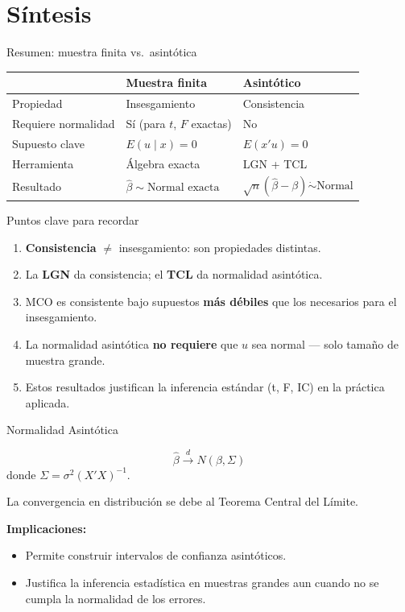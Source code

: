 \documentclass{beamer}
\begin{document}
\section{Síntesis}

\begin{frame}{Resumen: muestra finita vs.\ asintótica}
\begin{table}
\centering
\small
\begin{tabular}{lll}
\toprule
& \textbf{Muestra finita} & \textbf{Asintótico} \\
\midrule
Propiedad & Insesgamiento & Consistencia \\
Requiere normalidad & Sí (para $t$, $F$ exactas) & No \\
Supuesto clave & $E(u\mid x) = 0$ & $E(x'u) = 0$ \\
Herramienta & Álgebra exacta & LGN + TCL \\
Resultado & $\hat\beta \sim \text{Normal exacta}$ & $\sqrt{n}(\hat\beta-\beta) \dot\sim \text{Normal}$ \\
\bottomrule
\end{tabular}
\end{table}
\end{frame}

\begin{frame}{Puntos clave para recordar}
\begin{enumerate}
\item \textbf{Consistencia} $\neq$ insesgamiento: son propiedades distintas.
\item La \textbf{LGN} da consistencia; el \textbf{TCL} da normalidad asintótica.
\item MCO es consistente bajo supuestos \textbf{más débiles} que los necesarios para el insesgamiento.
\item La normalidad asintótica \textbf{no requiere} que $u$ sea normal — solo tamaño de muestra grande.
\item Estos resultados justifican la inferencia estándar (t, F, IC) en la práctica aplicada.
\end{enumerate}
\end{frame}

\begin{frame}{Normalidad Asintótica}

    
    \begin{equation}
         \hat{\beta}  \xrightarrow{d} N(\beta, \Sigma)
    \end{equation}
    donde $\Sigma = \sigma^2 (X'X)^{-1}$.

 {\color{blue} La convergencia en distribución   se debe al Teorema Central del Límite.}
  
    \textbf{Implicaciones:}
    \begin{itemize}
        \item Permite construir intervalos de confianza asintóticos.
        \item Justifica la inferencia estadística en muestras grandes aun cuando no se cumpla la normalidad de los errores.
    \end{itemize}
\end{frame}
\end{document}
